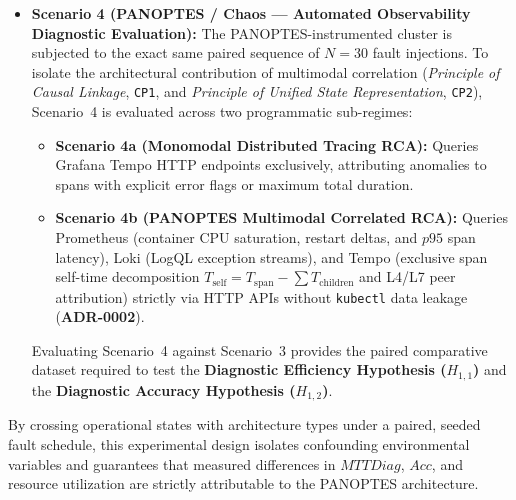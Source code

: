 \begin{itemize}
    \item \textbf{Scenario 4 (PANOPTES / Chaos --- Automated Observability Diagnostic Evaluation):} The PANOPTES-instrumented cluster is subjected to the exact same paired sequence of $N=30$ fault injections. To isolate the architectural contribution of multimodal correlation (\textit{Principle of Causal Linkage}, \texttt{CP1}, and \textit{Principle of Unified State Representation}, \texttt{CP2}), Scenario~4 is evaluated across two programmatic sub-regimes:
    \begin{itemize}
        \item \textbf{Scenario 4a (Monomodal Distributed Tracing RCA):} Queries Grafana Tempo HTTP endpoints exclusively, attributing anomalies to spans with explicit error flags or maximum total duration.
        \item \textbf{Scenario 4b (PANOPTES Multimodal Correlated RCA):} Queries Prometheus (container CPU saturation, restart deltas, and $p95$ span latency), Loki (LogQL exception streams), and Tempo (exclusive span self-time decomposition $T_{\text{self}} = T_{\text{span}} - \sum T_{\text{children}}$ and L4/L7 peer attribution) strictly via HTTP APIs without \texttt{kubectl} data leakage (\textbf{ADR-0002}).
    \end{itemize}
    Evaluating Scenario~4 against Scenario~3 provides the paired comparative dataset required to test the \textbf{Diagnostic Efficiency Hypothesis ($H_{1,1}$)} and the \textbf{Diagnostic Accuracy Hypothesis ($H_{1,2}$)}.
\end{itemize}

By crossing operational states with architecture types under a paired, seeded fault schedule, this experimental design isolates confounding environmental variables and guarantees that measured differences in $MTTDiag$, $Acc$, and resource utilization are strictly attributable to the PANOPTES architecture.
